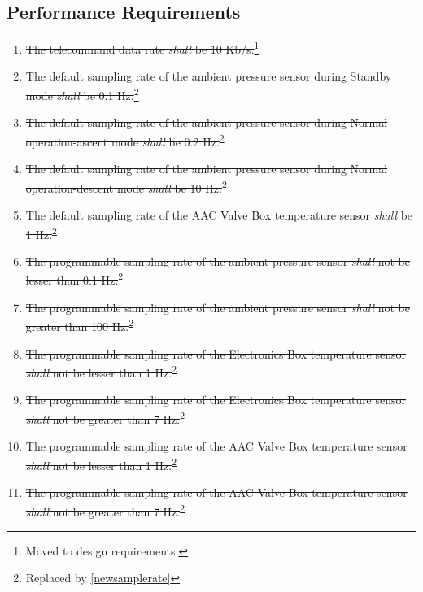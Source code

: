 \subsection{Performance Requirements}

\begin{enumerate}[label=P.\arabic*]
    \item \st{The telecommand data rate \textit{shall} be 10 Kb/s.}\footnote{Moved to design requirements.\label{designRequirement}}
    \item \st{The default sampling rate of the ambient pressure sensor during Standby mode \textit{shall} be 0.1 Hz.}\footnote{Replaced by \ref{newsamplerate}\label{replaceSampleRate}}
    \item \st{The default sampling rate of the ambient pressure sensor during Normal operation-ascent mode \textit{shall} be 0.2 Hz.}\textsuperscript{\ref{replaceSampleRate}}
    \item \st{The default sampling rate of the ambient pressure sensor during Normal operation-descent mode \textit{shall} be 10 Hz.}\textsuperscript{\ref{replaceSampleRate}}
    \item \st{The default sampling rate of the AAC Valve Box temperature sensor \textit{shall} be 1 Hz.}\textsuperscript{\ref{replaceSampleRate}}
    \item \st{The programmable sampling rate of the ambient pressure sensor \textit{shall} not be lesser than 0.1 Hz.}\textsuperscript{\ref{replaceSampleRate}}
    \item \st{The programmable sampling rate of the ambient pressure sensor \textit{shall} not be greater than 100 Hz.}\textsuperscript{\ref{replaceSampleRate}}
    \item \st{The programmable sampling rate of the Electronics Box temperature sensor \textit{shall} not be lesser than 1 Hz.}\textsuperscript{\ref{replaceSampleRate}}
    \item \st{The programmable sampling rate of the Electronics Box temperature sensor \textit{shall} not be greater than 7 Hz.}\textsuperscript{\ref{replaceSampleRate}}
    \item \st{The programmable sampling rate of the AAC Valve Box temperature sensor \textit{shall} not be lesser than 1 Hz.}\textsuperscript{\ref{replaceSampleRate}}
    \item \st{The programmable sampling rate of the AAC Valve Box temperature sensor \textit{shall} not be greater than 7 Hz.}\textsuperscript{\ref{replaceSampleRate}}

\end{enumerate}
